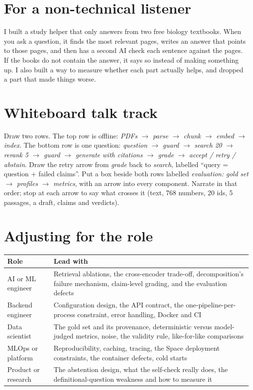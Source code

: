 \section{For a non-technical listener}

\begin{keyidea}
I built a study helper that only answers from two free biology textbooks. When you ask a question, it finds the most relevant pages, writes an answer that points to those pages, and then has a second AI check each sentence against the pages. If the books do not contain the answer, it says so instead of making something up. I also built a way to measure whether each part actually helps, and dropped a part that made things worse.
\end{keyidea}

\section{Whiteboard talk track}

Draw two rows. The top row is offline: \emph{PDFs $\rightarrow$ parse $\rightarrow$ chunk $\rightarrow$ embed $\rightarrow$ index}. The bottom row is one question: \emph{question $\rightarrow$ guard $\rightarrow$ search 20 $\rightarrow$ rerank 5 $\rightarrow$ guard $\rightarrow$ generate with citations $\rightarrow$ grade $\rightarrow$ accept / retry / abstain}. Draw the retry arrow from \emph{grade} back to \emph{search}, labelled \enquote{query = question + failed claims}. Put a box beside both rows labelled \emph{evaluation: gold set $\rightarrow$ profiles $\rightarrow$ metrics}, with an arrow into every component. Narrate in that order; stop at each arrow to say what crosses it (text, 768 numbers, 20 ids, 5 passages, a draft, claims and verdicts).

\section{Adjusting for the role}

\begin{center}
\begin{tabularx}{\textwidth}{@{}>{\raggedright\arraybackslash}p{3.4cm}L@{}}
\toprule
\textbf{Role} & \textbf{Lead with}\\
\midrule
AI or ML engineer & Retrieval ablations, the cross-encoder trade-off, decomposition's failure mechanism, claim-level grading, and the evaluation defects\\
Backend engineer & Configuration design, the API contract, the one-pipeline-per-process constraint, error handling, Docker and CI\\
Data scientist & The gold set and its provenance, deterministic versus model-judged metrics, noise, the validity rule, like-for-like comparisons\\
MLOps or platform & Reproducibility, caching, tracing, the Space deployment constraints, the container defects, cold starts\\
Product or research & The abstention design, what the self-check really does, the definitional-question weakness and how to measure it\\
\bottomrule
\end{tabularx}
\end{center}
